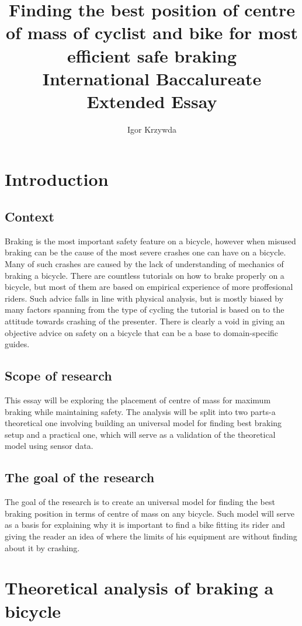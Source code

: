 \documentclass[12pt, a4]{article}
\title{%
Finding the best position of centre of mass of cyclist and bike for most efficient safe braking \\
\large International Baccalureate Extended Essay}
\author{Igor Krzywda}
\begin{document}
\maketitle

\section{Introduction}
\subsection{Context}
Braking is the most important safety feature on a bicycle, however when misused braking can be the cause of the
most severe crashes one can have on a bicycle. Many of such crashes are caused by the lack of understanding of
mechanics of braking a bicycle. There are countless tutorials on how to brake properly on a bicycle, but most of
them are based on empirical experience of more proffesional riders. Such advice falls in line with physical 
analysis, but is mostly biased by many factors spanning from the type of cycling the tutorial is based on to 
the attitude towards crashing of the presenter. There is clearly a void in giving an objective advice on safety 
on a bicycle that can be a base to domain-specific guides.

\subsection{Scope of research}
This essay will be exploring the placement of centre of mass for maximum braking while maintaining safety. 
The analysis will be split into two parts-a theoretical one involving building an universal model for finding 
best braking setup and a practical one, which will serve as a validation of the theoretical model using sensor
data.

\subsection{The goal of the research}
The goal of the research is to create an universal model for finding the best braking position in terms of
centre of mass on any bicycle. Such model will serve as a basis for explaining why it is important to find 
a bike fitting its rider and giving the reader an idea of where the limits of his equipment are without 
finding about it by crashing.

\section{Theoretical analysis of braking a bicycle}
\end{document}
